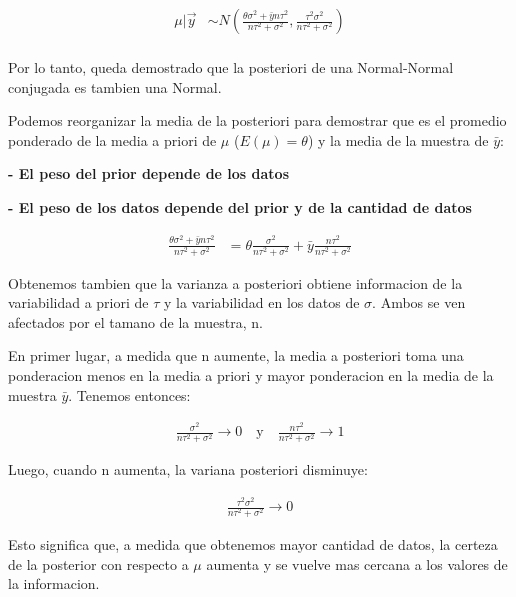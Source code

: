 \documentclass[
  letterpaper,
  DIV=11,
  numbers=noendperiod]{scrartcl}
\begin{document}
\[
\begin{aligned}
\mu|\vec{y} &\sim N\left(\frac{\theta\sigma^2 + \bar{y}n\tau^2}{n\tau^2 + \sigma^2}, \frac{\tau^2\sigma^2}{n\tau^2 + \sigma^2}\right) \\[3ex]
\end{aligned}
\]

Por lo tanto, queda demostrado que la posteriori de una Normal-Normal
conjugada es tambien una Normal.

Podemos reorganizar la media de la posteriori para demostrar que es el
promedio ponderado de la media a priori de \(\mu\) (\(E(\mu) = \theta\))
y la media de la muestra de \(\bar{y}\):

\textbf{- El peso del prior depende de los datos}

\textbf{- El peso de los datos depende del prior y de la cantidad de
datos}

\[
\begin{aligned}
\frac{\theta\sigma^2 + \bar{y}n\tau^2}{n\tau^2 + \sigma^2} &= \theta\frac{\sigma^2}{n\tau^2 + \sigma^2} + \bar{y}\frac{n\tau^2}{n\tau^2 + \sigma^2}
\end{aligned}
\]

Obtenemos tambien que la varianza a posteriori obtiene informacion de la
variabilidad a priori de \(\tau\) y la variabilidad en los datos de
\(\sigma\). Ambos se ven afectados por el tamano de la muestra, n.

En primer lugar, a medida que n aumente, la media a posteriori toma una
ponderacion menos en la media a priori y mayor ponderacion en la media
de la muestra \(\bar{y}\). Tenemos entonces:

\[
  \begin{aligned}
  \frac{\sigma^2}{n\tau^2 + \sigma^2} \to 0 \quad \text{y} \quad \frac{n\tau^2}{n\tau^2 + \sigma^2} \to 1
  \end{aligned}
  \]

Luego, cuando n aumenta, la variana posteriori disminuye:

\[
\begin{aligned}
\frac{\tau^2\sigma^2}{n\tau^2 + \sigma^2} \to 0
\end{aligned}
\]

Esto significa que, a medida que obtenemos mayor cantidad de datos, la
certeza de la posterior con respecto a \(\mu\) aumenta y se vuelve mas
cercana a los valores de la informacion.
\end{document}
